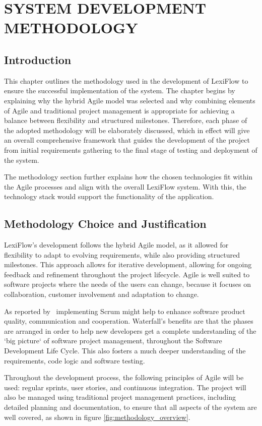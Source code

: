 \documentclass[oneside]{utmthesis}
\begin{document}
\chapter{SYSTEM DEVELOPMENT METHODOLOGY}
\section{Introduction}
This chapter outlines the methodology used in the development of LexiFlow to ensure the successful implementation of the system. The chapter begins by explaining why the hybrid Agile model was selected and why combining elements of Agile and traditional project management is appropriate for achieving a balance between flexibility and structured milestones. Therefore, each phase of the adopted methodology will be elaborately discussed, which in effect will give an overall comprehensive framework that guides the development of the project from initial requirements gathering to the final stage of testing and deployment of the system.

The methodology section further explains how the chosen technologies fit within the Agile processes and align with the overall LexiFlow system. With this, the technology stack would support the functionality of the application.

\section{Methodology Choice and Justification}
LexiFlow's development follows the hybrid Agile model, as it allowed for flexibility to adapt to evolving requirements, while also providing structured milestones. This approach allows for iterative development, allowing for ongoing feedback and refinement throughout the project lifecycle. Agile is well suited to software projects where the needs of the users can change, because it focuses on collaboration, customer involvement and adaptation to change.

As reported by~\citet{scrum} implementing Scrum might help to enhance software product quality, communication and cooperation.  Waterfall's benefits are that the phases are arranged in order to help new developers get a complete understanding of the `big picture` of software project management, throughout the Software Development Life Cycle. This also fosters a much deeper understanding of the requirements, code logic and software testing.

Throughout the development process, the following principles of Agile will be used: regular sprints, user stories, and continuous integration. The project will also be managed using traditional project management practices, including detailed planning and documentation, to ensure that all aspects of the system are well covered, as shown in figure {\ref{fig:methodology_overview}}.
\end{document}
